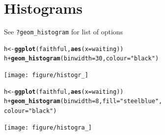 \documentclass{beamer}\usepackage[]{graphicx}\usepackage[]{color}
\makeatletter
\newcommand{\hlstr}[1]{\textcolor[rgb]{0.192,0.494,0.8}{#1}}%
\newcommand{\hlkwd}[1]{\textcolor[rgb]{0.737,0.353,0.396}{\textbf{#1}}}%
\newenvironment{kframe}{%
 \def\at@end@of@kframe{}%
 \ifinner\ifhmode%
  \def\at@end@of@kframe{\end{minipage}}%
  \begin{minipage}{\columnwidth}%
 \fi\fi%
 \def\FrameCommand##1{\hskip\@totalleftmargin \hskip-\fboxsep
 \colorbox{shadecolor}{##1}\hskip-\fboxsep
     \hskip-\linewidth \hskip-\@totalleftmargin \hskip\columnwidth}%
 \MakeFramed {\advance\hsize-\width
   \@totalleftmargin\z@ \linewidth\hsize
   \@setminipage}}%
 {\par\unskip\endMakeFramed%
 \at@end@of@kframe}
\newenvironment{knitrout}{}{} %
\makeatother
\begin{document}

\section*{Histograms}
\frame{\sectionpage}


\begin{frame}[fragile]
See \texttt{?geom\_histogram} for list of options
\begin{knitrout}\footnotesize
{}\color{fgcolor}\begin{kframe}
\begin{alltt}
h <- \hlkwd{ggplot}(faithful, \hlkwd{aes}(x = waiting))
h + \hlkwd{geom_histogram}(binwidth = 30, colour = \hlstr{"black"})
\end{alltt}
\end{kframe}

{\centering \texttt{[image: figure/histogr\_]} 

}



\end{knitrout}

\end{frame}


\begin{frame}[fragile]
\begin{knitrout}\footnotesize
{}\color{fgcolor}\begin{kframe}
\begin{alltt}
h <- \hlkwd{ggplot}(faithful, \hlkwd{aes}(x = waiting))
h + \hlkwd{geom_histogram}(binwidth = 8, fill = \hlstr{"steelblue"},
colour = \hlstr{"black"})
\end{alltt}
\end{kframe}

{\centering \texttt{[image: figure/histogra\_]} 

}



\end{knitrout}

\end{frame}
\end{document}
